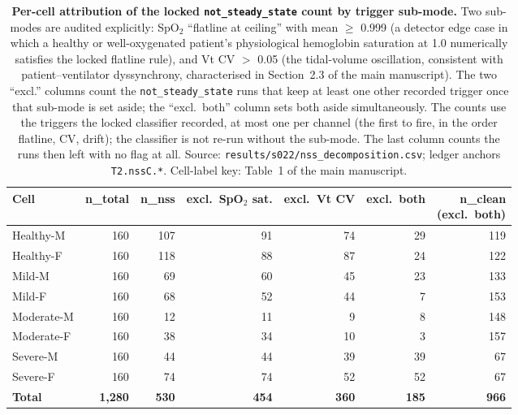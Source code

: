 \documentclass[pdflatex,sn-nature]{sn-jnl}%
\newcommand{\mainref}[2]{#2}
\begin{document}
\begin{table}[htbp]
\centering
\caption{\textbf{Per-cell attribution of the locked \texttt{not\_steady\_state} count by trigger sub-mode.} Two sub-modes are audited explicitly: SpO$_2$ ``flatline at ceiling'' with mean $\geq$ 0.999 (a detector edge case in which a healthy or well-oxygenated patient's physiological hemoglobin saturation at 1.0 numerically satisfies the locked flatline rule), and Vt CV $>$ 0.05 (the tidal-volume oscillation, consistent with patient--ventilator dyssynchrony, characterised in Section~\mainref{sec:results-vcac}{2.3} of the main manuscript). The two ``excl.'' columns count the \texttt{not\_steady\_state} runs that keep at least one other recorded trigger once that sub-mode is set aside; the ``excl.\ both'' column sets both aside simultaneously. The counts use the triggers the locked classifier recorded, at most one per channel (the first to fire, in the order flatline, CV, drift); the classifier is not re-run without the sub-mode. The last column counts the runs then left with no flag at all. Source: \texttt{results/s022/nss\_decomposition.csv}; ledger anchors \texttt{T2.nssC.*}. Cell-label key: Table~1 of the main manuscript.}
\label{tab:s4-nss}
\begin{tabular}{lrrrrrr}
\toprule
Cell & n\_total & n\_nss & excl.\ SpO$_2$ sat. & excl.\ Vt CV & excl.\ both & \shortstack[r]{n\_clean\\(excl.\ both)} \\
\midrule
Healthy-M & 160 & 107 & 91 & 74 & 29 & 119 \\
Healthy-F & 160 & 118 & 88 & 87 & 24 & 122 \\
\midrule
Mild-M & 160 & 69  & 60 & 45 & 23 & 133 \\
Mild-F & 160 & 68  & 52 & 44 & 7  & 153 \\
\midrule
Moderate-M & 160 & 12  & 11 & 9  & 8  & 148 \\
Moderate-F & 160 & 38  & 34 & 10 & 3  & 157 \\
\midrule
Severe-M & 160 & 44  & 44 & 39 & 39 & 67 \\
Severe-F & 160 & 74  & 74 & 52 & 52 & 67 \\
\midrule
\textbf{Total} & \textbf{1{,}280} & \textbf{530} & \textbf{454} & \textbf{360} & \textbf{185} & \textbf{966} \\
\bottomrule
\end{tabular}
\end{table}
\end{document}
